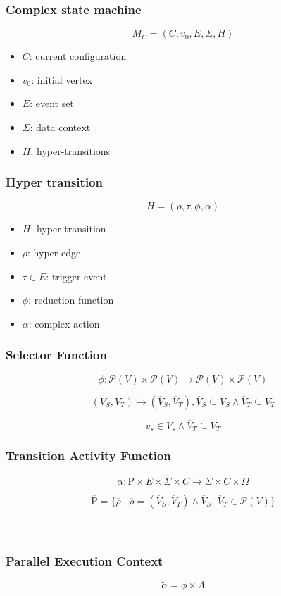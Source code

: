 \documentclass{beamer}
\begin{document}
\begin{frame}
    \frametitle{Complex state machine}
    \[ M_C = (C, v_0, E, \Sigma, H) \]
    \begin{itemize}
    		\item { $C$: current configuration}
    		\item { $v_0$: initial vertex }
    		\item { $E$: event set }
    		\item { $\Sigma$: data context}
    		\item { $H$: hyper-transitions }
    \end{itemize}
\end{frame}

\begin{frame}
    \frametitle{ Hyper transition }
    \[ H = (\rho, \tau, \phi, \alpha ) \]
    \begin{itemize}
    		\item { $H$: hyper-transition }
    		\item { $\rho $: hyper edge  }
    		\item { $\tau \in E$: trigger event }
    		\item { $\phi$: reduction function }
    		\item { $\alpha$: complex action }
    \end{itemize}
\end{frame}

\newcommand{\powset}{\mathcal{P}}
\newcommand{\Rho}{\mathrm{P}}
\newcommand{\Rhobar}{\overline{\Rho}}
\newcommand{\rhobar}{\overline{\rho}}
\newcommand{\Vbar}{\overline{V}}


\begin{frame}
    \frametitle{ Selector Function }
    \[ \phi: \powset(V) \times \powset(V) \rightarrow \powset(V) \times \powset(V) \]
    
        \[  (V_S, V_T) \rightarrow (\Vbar_S, \Vbar_T), \Vbar_S \subseteq V_S \land \Vbar_T \subseteq V_T  \]
        
           \[  v_s \in V_s \land \overline{V}_T \subseteq V_T \]
        
\end{frame}

\begin{frame}
    \frametitle{ Transition Activity Function }
    
   \[ \alpha: \overline{\mathrm{P}} \times E \times \Sigma \times C \rightarrow \Sigma \times C \times \Omega \]
   
   \[ \Rhobar = \{ \rhobar \;|\; \rhobar = (\Vbar_S, \overline{V}_T) \land \Vbar_S,\, \Vbar_T \in  \powset(V) \} \]\\\      
        
\end{frame}

\begin{frame}
    \frametitle{ Parallel Execution Context }
    
   
   \[ \widetilde{\alpha} = \phi \times \Lambda \]

        
\end{frame}
\end{document}
